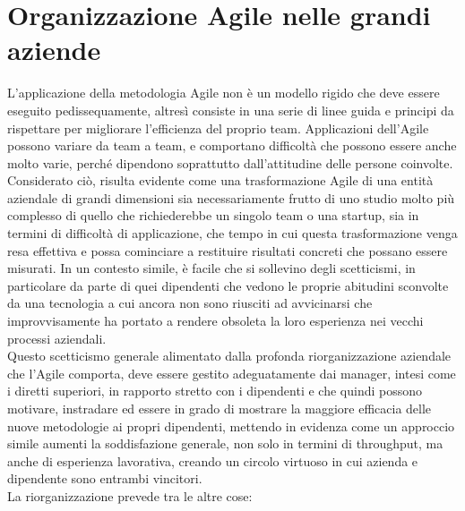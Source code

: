 \documentclass[a4paper, 12pt]{report}
\numberwithin{equation}{section}
\begin{document}
\section{Organizzazione Agile nelle grandi aziende}
L’applicazione della metodologia Agile non è un modello rigido che deve essere eseguito pedissequamente, altresì consiste in una serie di linee guida e principi da rispettare per migliorare l’efficienza del proprio team. Applicazioni dell’Agile possono variare da team a team, e comportano difficoltà che possono essere anche molto varie, perché dipendono soprattutto dall'attitudine delle persone coinvolte.\\
Considerato ciò, risulta evidente come una trasformazione Agile di una entità aziendale di grandi dimensioni sia necessariamente frutto di uno studio molto più complesso di quello che richiederebbe un singolo team o una startup, sia in termini di difficoltà di applicazione, che tempo in cui questa trasformazione venga resa effettiva e possa cominciare a restituire risultati concreti che possano essere misurati.
In un contesto simile, è facile che si sollevino degli scetticismi, in particolare da parte di quei dipendenti che vedono le proprie abitudini sconvolte da una tecnologia a cui ancora non sono riusciti ad avvicinarsi che improvvisamente ha portato a rendere obsoleta la loro esperienza nei vecchi processi aziendali.\\
Questo scetticismo generale alimentato dalla profonda riorganizzazione aziendale che l’Agile comporta, deve essere gestito adeguatamente dai manager, intesi come i diretti superiori, in rapporto stretto con i dipendenti e che quindi possono motivare, instradare ed essere in grado di mostrare la maggiore efficacia delle nuove metodologie ai propri dipendenti, mettendo in evidenza come un approccio simile aumenti la soddisfazione generale, non solo in termini di throughput, ma anche di esperienza lavorativa, creando un circolo virtuoso in cui azienda e dipendente sono entrambi vincitori.\\
La riorganizzazione prevede tra le altre cose:
\end{document}
